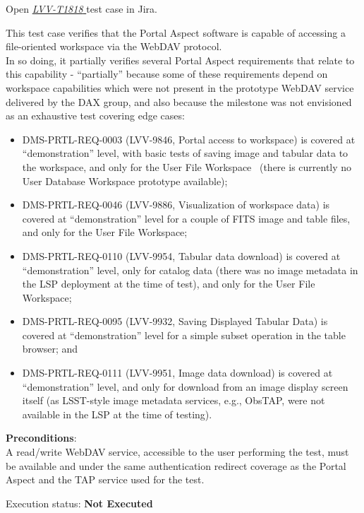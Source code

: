 \documentclass[DM,lsstdraft,STR,toc]{lsstdoc}
\providecommand{\tightlist}{
  \setlength{\itemsep}{0pt}\setlength{\parskip}{0pt}}
\begin{document}
Open  \href{https://jira.lsstcorp.org/secure/Tests.jspa#/testCase/LVV-T1818}{\textit{ LVV-T1818 } }
test case in Jira.

This test case verifies that the Portal Aspect software is capable of
accessing a file-oriented workspace via the WebDAV
protocol.\\[2\baselineskip]In so doing, it partially verifies several
Portal Aspect requirements that relate to this capability -
``partially'' because some of these requirements depend on workspace
capabilities which were not present in the prototype WebDAV service
delivered by the DAX group, and also because the milestone was not
envisioned as an exhaustive test covering edge cases:

\begin{itemize}
\tightlist
\item
  DMS-PRTL-REQ-0003 (LVV-9846, Portal access to workspace) is covered at
  ``demonstration'' level, with basic tests of saving image and tabular
  data to the workspace, and only for the User File Workspace ~(there is
  currently no User Database Workspace prototype available);
\item
  DMS-PRTL-REQ-0046 (LVV-9886, Visualization of workspace data) is
  covered at ``demonstration'' level for a couple of FITS image and
  table files, and only for the User File Workspace;
\item
  DMS-PRTL-REQ-0110 (LVV-9954, Tabular data download) is covered at
  ``demonstration'' level, only for catalog data (there was no image
  metadata in the LSP deployment at the time of test), and only for the
  User File Workspace;~
\item
  DMS-PRTL-REQ-0095 (LVV-9932, Saving Displayed Tabular Data) is covered
  at ``demonstration'' level for a simple subset operation in the table
  browser; and
\item
  DMS-PRTL-REQ-0111 (LVV-9951, Image data download) is covered at
  ``demonstration'' level, and only for download from an image display
  screen itself (as LSST-style image metadata services, e.g., ObsTAP,
  were not available in the LSP at the time of testing).
\end{itemize}

\textbf{ Preconditions}:\\
A read/write WebDAV service, accessible to the user performing the test,
must be available and under the same authentication redirect coverage as
the Portal Aspect and the TAP service used for the test.

Execution status: {\bf Not Executed }
\end{document}
